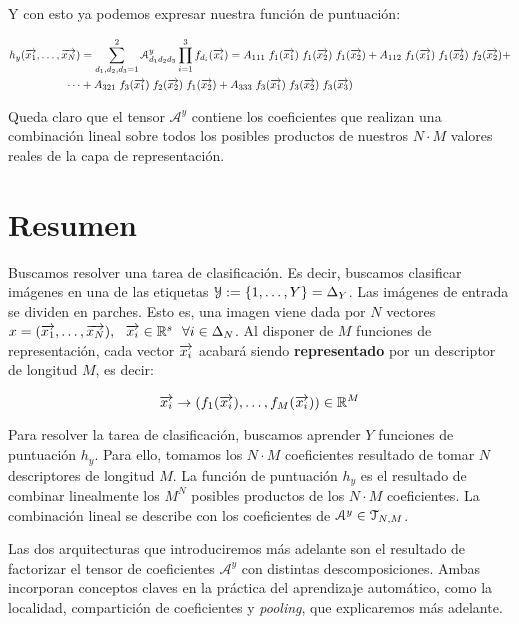 Y con esto ya podemos expresar nuestra función de puntuación:

\begin{equation}
	\begin{split}
		h_y(\overrightarrow{x_1}, \ldots, \overrightarrow{x_N}) &= \sum_{d_1, d_2, d_3 = 1}^{2} \mathcal{A}^y_{d_1 d_2 d_3} \prod_{i = 1}^3 f_{d_i}(\overrightarrow{x_i}) = A_{111} \; f_1(\overrightarrow{x_1}) \; f_1(\overrightarrow{x_2}) \; f_1(\overrightarrow{x_2}) + A_{112} \; f_1(\overrightarrow{x_1}) \; f_1(\overrightarrow{x_2}) \; f_2(\overrightarrow{x_2}) + \\
		\cdots &+ A_{321} \; f_3(\overrightarrow{x_1}) \; f_2(\overrightarrow{x_2}) \; f_1(\overrightarrow{x_2}) + A_{333} \; f_3(\overrightarrow{x_1}) \; f_3(\overrightarrow{x_2}) \; f_3(\overrightarrow{x_3})
	\end{split}
\end{equation}

Queda claro que el tensor $\mathcal{A}^y$ contiene los coeficientes que realizan una combinación lineal sobre todos los posibles productos de nuestros $N \cdot M$ valores reales de la capa de representación.

\section{Resumen}

Buscamos resolver una tarea de clasificación. Es decir, buscamos clasificar imágenes en una de las etiquetas $\mathcal{Y} := \{1, \ldots, Y\} = \Delta_{Y}$. Las imágenes de entrada se dividen en parches. Esto es, una imagen viene dada por $N$ vectores $x = (\overrightarrow{x_1}, \ldots, \overrightarrow{x_N}), \ \  \overrightarrow{x_i} \in \mathbb{R}^s \ \  \forall i \in \Delta_{N}$. Al disponer de $M$ funciones de representación, cada vector $\overrightarrow{x_i}$ acabará siendo \textbf{representado} por un descriptor de longitud $M$, es decir:

\begin{equation}
	\overrightarrow{x_i} \to (f_1(\overrightarrow{x_i}), \ldots, f_M(\overrightarrow{x_i})) \in \mathbb{R}^M
\end{equation}

Para resolver la tarea de clasificación, buscamos aprender $Y$ funciones de puntuación $h_y$. Para ello, tomamos los $N \cdot M$ coeficientes resultado de tomar $N$ descriptores de longitud $M$. La función de puntuación $h_y$ es el resultado de combinar linealmente los $M^N$ posibles productos de los $N \cdot M$ coeficientes. La combinación lineal se describe con los coeficientes de $\mathcal{A}^y \in \mathcal{T}_{N, M}$.

Las dos arquitecturas que introduciremos más adelante son el resultado de factorizar el tensor de coeficientes $\mathcal{A}^y$ con distintas descomposiciones. Ambas incorporan conceptos claves en la práctica del aprendizaje automático, como la localidad, compartición de coeficientes y \textit{pooling}, que explicaremos más adelante.
